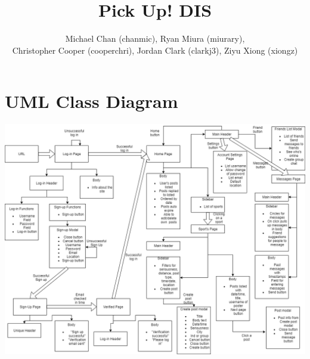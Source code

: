 \documentclass[a4paper]{article}
\title{Pick Up! DIS}
\author{Michael Chan (chanmic), Ryan Miura (miurary), \\Christopher Cooper (cooperchri), Jordan Clark (clarkj3), Ziyu Xiong (xiongz)}
\begin{document}
\maketitle

\section{UML Class Diagram}
\includegraphics[width=1\textwidth]{cs361_1.png}
\newpage
\end{document}

